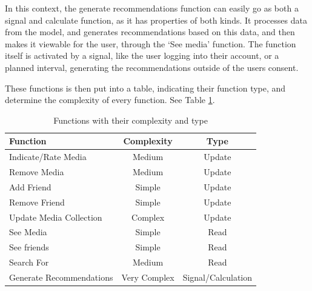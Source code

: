 In this context, the generate recommendations function can easily go as both a signal and calculate function, as it has properties of both kinds. It processes data from the model, and generates recommendations based on this data, and then makes it viewable for the user, through the ‘See media’ function. The function itself is activated by a signal, like the user logging into their account, or a planned interval, generating the recommendations outside of the users consent.

These functions is then put into a table, indicating their function type, and determine the complexity of every function. See Table \ref{FuncTable}.

\begin{table}[htb]
\centering
\begin{tabular}{|l|c|c|} \hline
	 \textbf{Function} & \textbf{Complexity} & \textbf{Type} \\ \hline
	Indicate/Rate Media & Medium & Update \\ \hline
	Remove Media & Medium & Update \\ \hline
	Add Friend & Simple & Update \\ \hline
	Remove Friend & Simple & Update \\ \hline
	Update Media Collection & Complex & Update \\ \hline
	See Media & Simple & Read \\ \hline
	See friends & Simple & Read \\ \hline
	Search For & Medium & Read \\ \hline
	Generate Recommendations & Very Complex & Signal/Calculation \\ \hline
\end{tabular}
\caption{Functions with their complexity and type}
\label{FuncTable}
\end{table}